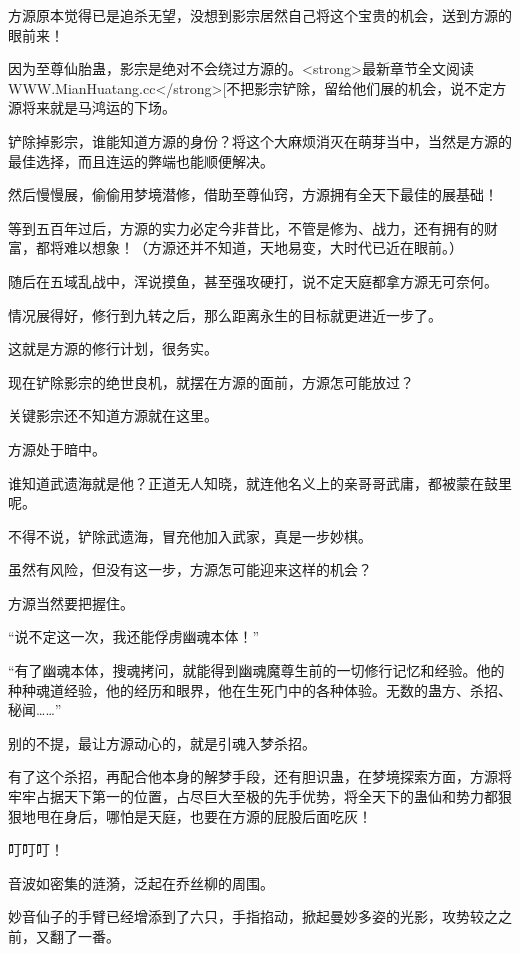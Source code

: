 
\begin{this_body}

方源原本觉得已是追杀无望，没想到影宗居然自己将这个宝贵的机会，送到方源的眼前来！

因为至尊仙胎蛊，影宗是绝对不会绕过方源的。<strong>最新章节全文阅读WWW.MianHuatang.cc</strong>[不把影宗铲除，留给他们展的机会，说不定方源将来就是马鸿运的下场。

铲除掉影宗，谁能知道方源的身份？将这个大麻烦消灭在萌芽当中，当然是方源的最佳选择，而且连运的弊端也能顺便解决。

然后慢慢展，偷偷用梦境潜修，借助至尊仙窍，方源拥有全天下最佳的展基础！

等到五百年过后，方源的实力必定今非昔比，不管是修为、战力，还有拥有的财富，都将难以想象！（方源还并不知道，天地易变，大时代已近在眼前。）

随后在五域乱战中，浑说摸鱼，甚至强攻硬打，说不定天庭都拿方源无可奈何。

情况展得好，修行到九转之后，那么距离永生的目标就更进近一步了。

这就是方源的修行计划，很务实。

现在铲除影宗的绝世良机，就摆在方源的面前，方源怎可能放过？

关键影宗还不知道方源就在这里。

方源处于暗中。

谁知道武遗海就是他？正道无人知晓，就连他名义上的亲哥哥武庸，都被蒙在鼓里呢。

不得不说，铲除武遗海，冒充他加入武家，真是一步妙棋。

虽然有风险，但没有这一步，方源怎可能迎来这样的机会？

方源当然要把握住。

“说不定这一次，我还能俘虏幽魂本体！”

“有了幽魂本体，搜魂拷问，就能得到幽魂魔尊生前的一切修行记忆和经验。他的种种魂道经验，他的经历和眼界，他在生死门中的各种体验。无数的蛊方、杀招、秘闻……”

别的不提，最让方源动心的，就是引魂入梦杀招。

有了这个杀招，再配合他本身的解梦手段，还有胆识蛊，在梦境探索方面，方源将牢牢占据天下第一的位置，占尽巨大至极的先手优势，将全天下的蛊仙和势力都狠狠地甩在身后，哪怕是天庭，也要在方源的屁股后面吃灰！

叮叮叮！

音波如密集的涟漪，泛起在乔丝柳的周围。

妙音仙子的手臂已经增添到了六只，手指掐动，掀起曼妙多姿的光影，攻势较之之前，又翻了一番。


\end{this_body}

